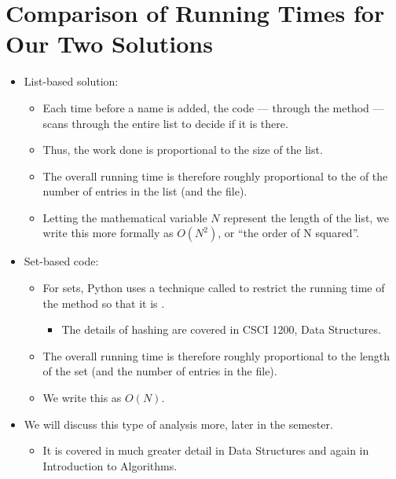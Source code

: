 \documentclass[letterpaper,10pt,english]{sphinxmanual}
\begin{document}
\section{Comparison of Running Times for Our Two Solutions}
\label{\detokenize{lecture_notes/lec15_sets:comparison-of-running-times-for-our-two-solutions}}\begin{itemize}
\item {} 
List-based solution:
\begin{itemize}
\item {} 
Each time before a name is added, the code — through the method
 — scans through the entire list to decide if it is there.

\item {} 
Thus, the work done is proportional to the size of the list.

\item {} 
The overall running time is therefore roughly proportional to the
 of the number of entries in the list (and the file).

\item {} 
Letting the mathematical variable \(N\) represent the length
of the list, we write this more formally as \(O(N^2)\), or
“the order of N squared”.

\end{itemize}

\item {} 
Set-based code:
\begin{itemize}
\item {} 
For sets, Python uses a technique called  to restrict the
running time of the  method so that it is .
\begin{itemize}
\item {} 
The details of hashing are covered in CSCI 1200, Data
Structures.

\end{itemize}

\item {} 
The overall running time is therefore roughly proportional to the
length of the set (and the number of entries in the file).

\item {} 
We write this as \(O(N)\).

\end{itemize}

\item {} 
We will discuss this type of analysis more, later in the semester.
\begin{itemize}
\item {} 
It is covered in much greater detail in Data Structures and again
in Introduction to Algorithms.

\end{itemize}

\end{itemize}
\end{document}
